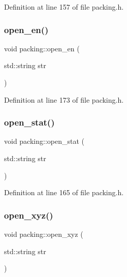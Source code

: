 Definition at line 157 of file packing.\+h.

\mbox{\label{classpacking_a8afd538218a84fa24e14d58ecbd8066b}} 
\subsubsection{\texorpdfstring{open\+\_\+en()}{open\_en()}}
{\footnotesize\ttfamily void packing\+::open\+\_\+en (\begin{DoxyParamCaption}\item[{std\+::string}]{str }\end{DoxyParamCaption})\hspace{0.3cm}{\ttfamily [inline]}}



Definition at line 173 of file packing.\+h.

\mbox{\label{classpacking_aafe0cb05420e66caa923930222ff1bb0}} 
\subsubsection{\texorpdfstring{open\+\_\+stat()}{open\_stat()}}
{\footnotesize\ttfamily void packing\+::open\+\_\+stat (\begin{DoxyParamCaption}\item[{std\+::string}]{str }\end{DoxyParamCaption})\hspace{0.3cm}{\ttfamily [inline]}}



Definition at line 165 of file packing.\+h.

\mbox{\label{classpacking_a0c837c1a1a49e78d98e3caa99452ba48}} 
\subsubsection{\texorpdfstring{open\+\_\+xyz()}{open\_xyz()}}
{\footnotesize\ttfamily void packing\+::open\+\_\+xyz (\begin{DoxyParamCaption}\item[{std\+::string}]{str }\end{DoxyParamCaption})\hspace{0.3cm}{\ttfamily [inline]}}



